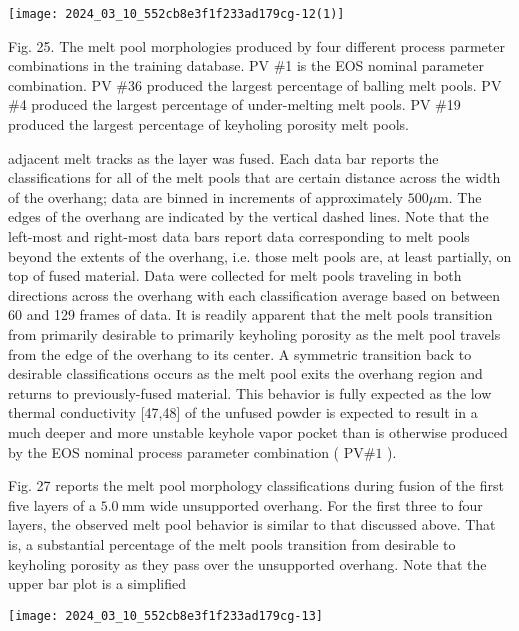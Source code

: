 \documentclass[10pt]{article}
\begin{document}
\begin{center}
\texttt{[image: 2024\_03\_10\_552cb8e3f1f233ad179cg-12(1)]}
\end{center}

Fig. 25. The melt pool morphologies produced by four different process parmeter combinations in the training database. PV \#1 is the EOS nominal parameter combination. PV \#36 produced the largest percentage of balling melt pools. PV \#4 produced the largest percentage of under-melting melt pools. PV \#19 produced the largest percentage of keyholing porosity melt pools.

adjacent melt tracks as the layer was fused. Each data bar reports the classifications for all of the melt pools that are certain distance across the width of the overhang; data are binned in increments of approximately $500 \mu \mathrm{m}$. The edges of the overhang are indicated by the vertical dashed lines. Note that the left-most and right-most data bars report data corresponding to melt pools beyond the extents of the overhang, i.e. those melt pools are, at least partially, on top of fused material. Data were collected for melt pools traveling in both directions across the overhang with each classification average based on between 60 and 129 frames of data. It is readily apparent that the melt pools transition from primarily desirable to primarily keyholing porosity as the melt pool travels from the edge of the overhang to its center. A symmetric transition back to desirable classifications occurs as the melt pool exits the overhang region and returns to previously-fused material. This behavior is fully expected as the low thermal conductivity [47,48] of the unfused powder is expected to result in a much deeper and more unstable keyhole vapor pocket than is otherwise produced by the EOS nominal process parameter combination ( $\mathrm{PV} \# 1$ ).

Fig. 27 reports the melt pool morphology classifications during fusion of the first five layers of a $5.0 \mathrm{~mm}$ wide unsupported overhang. For the first three to four layers, the observed melt pool behavior is similar to that discussed above. That is, a substantial percentage of the melt pools transition from desirable to keyholing porosity as they pass over the unsupported overhang. Note that the upper bar plot is a simplified

\begin{center}
\texttt{[image: 2024\_03\_10\_552cb8e3f1f233ad179cg-13]}
\end{center}
\end{document}
